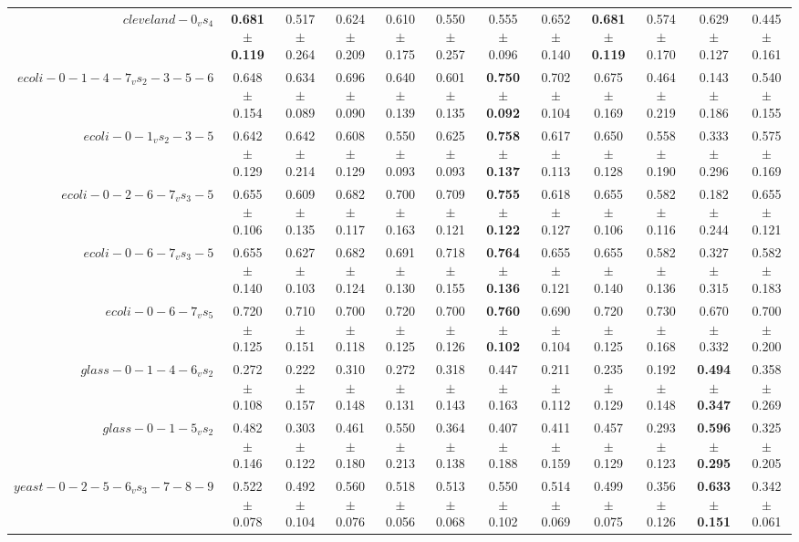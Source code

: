 \begin{table}[!ht]
{\begin{tabular}{r c c c c c c c c c c c}
$cleveland-0_vs_4$ & \textbf{0.681 $\pm$ 0.119} & 0.517 $\pm$ 0.264 & 0.624 $\pm$ 0.209 & 0.610 $\pm$ 0.175 & 0.550 $\pm$ 0.257 & 0.555 $\pm$ 0.096 & 0.652 $\pm$ 0.140 & \textbf{0.681 $\pm$ 0.119} & 0.574 $\pm$ 0.170 & 0.629 $\pm$ 0.127 & 0.445 $\pm$ 0.161 \\
$ecoli-0-1-4-7_vs_2-3-5-6$ & 0.648 $\pm$ 0.154 & 0.634 $\pm$ 0.089 & 0.696 $\pm$ 0.090 & 0.640 $\pm$ 0.139 & 0.601 $\pm$ 0.135 & \textbf{0.750 $\pm$ 0.092} & 0.702 $\pm$ 0.104 & 0.675 $\pm$ 0.169 & 0.464 $\pm$ 0.219 & 0.143 $\pm$ 0.186 & 0.540 $\pm$ 0.155 \\
$ecoli-0-1_vs_2-3-5$ & 0.642 $\pm$ 0.129 & 0.642 $\pm$ 0.214 & 0.608 $\pm$ 0.129 & 0.550 $\pm$ 0.093 & 0.625 $\pm$ 0.093 & \textbf{0.758 $\pm$ 0.137} & 0.617 $\pm$ 0.113 & 0.650 $\pm$ 0.128 & 0.558 $\pm$ 0.190 & 0.333 $\pm$ 0.296 & 0.575 $\pm$ 0.169 \\
$ecoli-0-2-6-7_vs_3-5$ & 0.655 $\pm$ 0.106 & 0.609 $\pm$ 0.135 & 0.682 $\pm$ 0.117 & 0.700 $\pm$ 0.163 & 0.709 $\pm$ 0.121 & \textbf{0.755 $\pm$ 0.122} & 0.618 $\pm$ 0.127 & 0.655 $\pm$ 0.106 & 0.582 $\pm$ 0.116 & 0.182 $\pm$ 0.244 & 0.655 $\pm$ 0.121 \\
$ecoli-0-6-7_vs_3-5$ & 0.655 $\pm$ 0.140 & 0.627 $\pm$ 0.103 & 0.682 $\pm$ 0.124 & 0.691 $\pm$ 0.130 & 0.718 $\pm$ 0.155 & \textbf{0.764 $\pm$ 0.136} & 0.655 $\pm$ 0.121 & 0.655 $\pm$ 0.140 & 0.582 $\pm$ 0.136 & 0.327 $\pm$ 0.315 & 0.582 $\pm$ 0.183 \\
$ecoli-0-6-7_vs_5$ & 0.720 $\pm$ 0.125 & 0.710 $\pm$ 0.151 & 0.700 $\pm$ 0.118 & 0.720 $\pm$ 0.125 & 0.700 $\pm$ 0.126 & \textbf{0.760 $\pm$ 0.102} & 0.690 $\pm$ 0.104 & 0.720 $\pm$ 0.125 & 0.730 $\pm$ 0.168 & 0.670 $\pm$ 0.332 & 0.700 $\pm$ 0.200 \\
$glass-0-1-4-6_vs_2$ & 0.272 $\pm$ 0.108 & 0.222 $\pm$ 0.157 & 0.310 $\pm$ 0.148 & 0.272 $\pm$ 0.131 & 0.318 $\pm$ 0.143 & 0.447 $\pm$ 0.163 & 0.211 $\pm$ 0.112 & 0.235 $\pm$ 0.129 & 0.192 $\pm$ 0.148 & \textbf{0.494 $\pm$ 0.347} & 0.358 $\pm$ 0.269 \\
$glass-0-1-5_vs_2$ & 0.482 $\pm$ 0.146 & 0.303 $\pm$ 0.122 & 0.461 $\pm$ 0.180 & 0.550 $\pm$ 0.213 & 0.364 $\pm$ 0.138 & 0.407 $\pm$ 0.188 & 0.411 $\pm$ 0.159 & 0.457 $\pm$ 0.129 & 0.293 $\pm$ 0.123 & \textbf{0.596 $\pm$ 0.295} & 0.325 $\pm$ 0.205 \\
$yeast-0-2-5-6_vs_3-7-8-9$ & 0.522 $\pm$ 0.078 & 0.492 $\pm$ 0.104 & 0.560 $\pm$ 0.076 & 0.518 $\pm$ 0.056 & 0.513 $\pm$ 0.068 & 0.550 $\pm$ 0.102 & 0.514 $\pm$ 0.069 & 0.499 $\pm$ 0.075 & 0.356 $\pm$ 0.126 & \textbf{0.633 $\pm$ 0.151} & 0.342 $\pm$ 0.061 \\

\end{tabular}}
\end{table}
